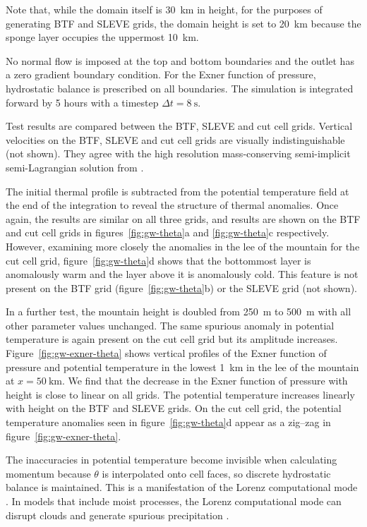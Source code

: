 \documentclass[twocol]{ametsoc}
\begin{document}
Note that, while the domain itself is \SI{30}{\kilo\meter} in height, for the purposes of generating BTF and SLEVE grids, the domain height is set to \SI{20}{\kilo\meter} because the sponge layer occupies the uppermost \SI{10}{\kilo\meter}.

No normal flow is imposed at the top and bottom boundaries and the outlet has a zero gradient boundary condition.  For the Exner function of pressure, hydrostatic balance is prescribed on all boundaries.  The simulation is integrated forward by 5 hours with a timestep $\Delta t = \SI{8}{\second}$.

Test results are compared between the BTF, SLEVE and cut cell grids.  Vertical velocities on the BTF, SLEVE and cut cell grids are visually indistinguishable (not shown).  They agree with the high resolution mass-conserving semi-implicit semi-Lagrangian solution from \citet{melvin2010}.

The initial thermal profile is subtracted from the potential temperature field at the end of the integration to reveal the structure of thermal anomalies.  Once again, the results are similar on all three grids, and results are shown on the BTF and cut cell grids in figures~\ref{fig:gw-theta}a and \ref{fig:gw-theta}c respectively.  However, examining more closely the anomalies in the lee of the mountain for the cut cell grid, figure~\ref{fig:gw-theta}d shows that the bottommost layer is anomalously warm and the layer above it is anomalously cold.  This feature is not present on the BTF grid (figure~\ref{fig:gw-theta}b) or the SLEVE grid (not shown).  

In a further test, the mountain height is doubled from \SI{250}{\meter} to \SI{500}{\meter} with all other parameter values unchanged.  The same spurious anomaly in potential temperature is again present on the cut cell grid but its amplitude increases.  Figure~\ref{fig:gw-exner-theta} shows vertical profiles of the Exner function of pressure and potential temperature in the lowest \SI{1}{\kilo\meter} in the lee of the mountain at \(x = \SI{50}{\kilo\meter}\).  We find that the decrease in the Exner function of pressure with height is close to linear on all grids.  The potential temperature increases linearly with height on the BTF and SLEVE grids.  On the cut cell grid, the potential temperature anomalies seen in figure~\ref{fig:gw-theta}d appear as a zig--zag in figure~\ref{fig:gw-exner-theta}.

The inaccuracies in potential temperature become invisible when calculating momentum because $\theta$ is interpolated onto cell faces, so discrete hydrostatic balance is maintained.  This is a manifestation of the Lorenz computational mode \citep{arakawa-konor1996,holdaway2013b}.  In models that include moist processes, the Lorenz computational mode can disrupt clouds and generate spurious precipitation \citep{hollingsworth1995}.
\end{document}
